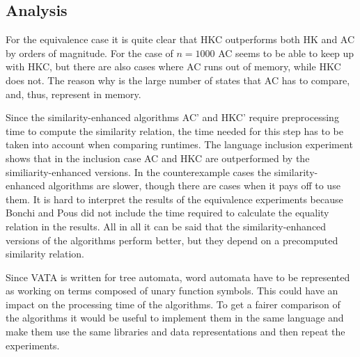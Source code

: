 \subsection{Analysis}

For the equivalence case it is quite clear that HKC outperforms both HK and AC
by orders of magnitude.
For the case of $n = 1000$ AC seems to be able to keep up with HKC, but
there are also cases where AC runs out of memory, while HKC does not.
The reason why is the large number of states that AC has to compare, and, thus,
represent in memory.

Since the similarity-enhanced algorithms AC' and HKC' require preprocessing time
to compute the similarity relation, the time needed for this step has to be
taken into account when comparing runtimes.
The language inclusion experiment shows that in the inclusion case AC and HKC
are outperformed by the similiarity-enhanced versions.
In the counterexample cases the similarity-enhanced algorithms are slower,
though there are cases when it pays off to use them.
It is hard to interpret the results of the equivalence experiments because
Bonchi and Pous did not include the time required to calculate the equality
relation in the results.
All in all it can be said that the similarity-enhanced versions of the
algorithms perform better, but they depend on a precomputed similarity relation.

Since VATA is written for tree automata, word automata have to be represented
as working on terms composed of unary function symbols.
This could have an impact on the processing time of the algorithms.
To get a fairer comparison of the algorithms it would be useful to implement
them in the same language and make them use the same libraries and data
representations and then repeat the experiments.
